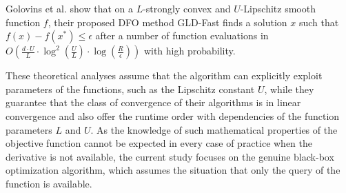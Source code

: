 \documentclass[journal]{IEEEtran}
\renewcommand{\leq}{\leqslant} %
\theoremstyle{definition}
\newcommand{\yohe}[1]{{\color{cyan}Y.A.: #1}}
\newcommand{\mori}[1]{{\color[rgb]{0.22, 0.71, 0.55} MORINAGA :  #1}}
\begin{document}
    Golovins et al.\cite{2019gradientlesgolovins} show that on a $L$-strongly convex and $U$-Lipschitz smooth function $f$, their proposed DFO method GLD-Fast finds a solution $x$ such that $f(x) - f(x^*)\leq \epsilon$ after a number of function evaluations in $O\left(\frac{d\cdot U}{L}\cdot\log^2\left(\frac{U}{L}\right)\cdot\log\left(\frac{R}{\epsilon}\right)\right)$ with high probability.
    
    These theoretical analyses assume that the algorithm can explicitly exploit parameters of the functions, such as the Lipschitz constant $U$, while they guarantee that the class of convergence of their algorithms is in linear convergence and also offer the runtime order with dependencies of the function parameters $L$ and $U$.
    As the knowledge of such mathematical properties of the objective function cannot be expected in every case of practice when the derivative is not available,
    the current study focuses on the genuine black-box optimization algorithm, which assumes the situation that only the query of the function is available.




\end{document}

